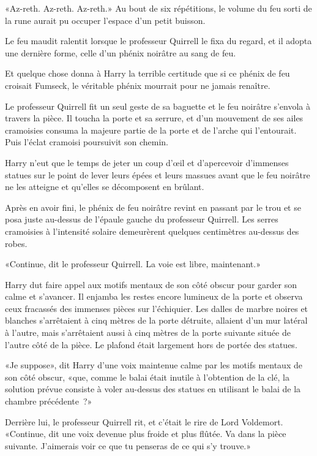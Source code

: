 «Az-reth. Az-reth. Az-reth.» Au bout de six répétitions, le volume du feu sorti de la rune aurait pu occuper l'espace d'un petit buisson.

Le feu maudit ralentit lorsque le professeur Quirrell le fixa du regard, et il adopta une dernière forme, celle d'un phénix noirâtre au sang de feu.

Et quelque chose donna à Harry la terrible certitude que si ce phénix de feu croisait Fumseck, le véritable phénix mourrait pour ne jamais renaître.

Le professeur Quirrell fit un seul geste de sa baguette et le feu noirâtre s'envola à travers la pièce. Il toucha la porte et sa serrure, et d'un mouvement de ses ailes cramoisies consuma la majeure partie de la porte et de l'arche qui l'entourait. Puis l'éclat cramoisi poursuivit son chemin.

Harry n'eut que le temps de jeter un coup d'œil et d'apercevoir d'immenses statues sur le point de lever leurs épées et leurs massues avant que le feu noirâtre ne les atteigne et qu'elles se décomposent en brûlant.

Après en avoir fini, le phénix de feu noirâtre revint en passant par le trou et se posa juste au-dessus de l'épaule gauche du professeur Quirrell. Les serres cramoisies à l'intensité solaire demeurèrent quelques centimètres au-dessus des robes.

«Continue, dit le professeur Quirrell. La voie est libre, maintenant.»

Harry dut faire appel aux motifs mentaux de son côté obscur pour garder son calme et s'avancer. Il enjamba les restes encore lumineux de la porte et observa ceux fracassés des immenses pièces sur l'échiquier. Les dalles de marbre noires et blanches s'arrêtaient à cinq mètres de la porte détruite, allaient d'un mur latéral à l'autre, mais s'arrêtaient aussi à cinq mètres de la porte suivante située de l'autre côté de la pièce. Le plafond était largement hors de portée des statues.

«Je suppose», dit Harry d'une voix maintenue calme par les motifs mentaux de son côté obscur, «que, comme le balai était inutile à l'obtention de la clé, la solution prévue consiste à voler au-dessus des statues en utilisant le balai de la chambre précédente~?»

Derrière lui, le professeur Quirrell rit, et c'était le rire de Lord Voldemort. «Continue, dit une voix devenue plus froide et plus flûtée. Va dans la pièce suivante. J'aimerais voir ce que tu penseras de ce qui s'y trouve.»

